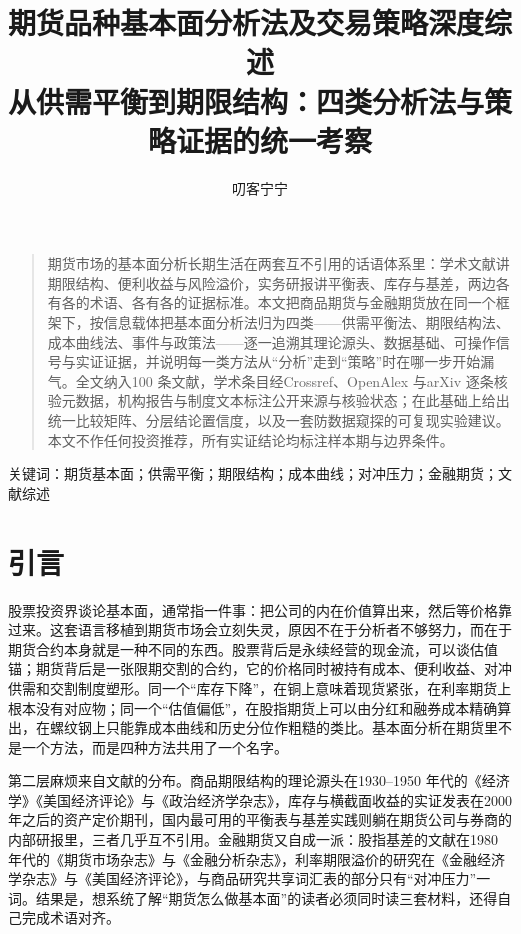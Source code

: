 \documentclass[12pt,a4paper]{ctexart}
\title{\heiti 期货品种基本面分析法及交易策略深度综述\\[4pt]\Large 从供需平衡到期限结构：四类分析法与策略证据的统一考察}
\author{叨客宁宁}
\date{}
\begin{document}
\maketitle
\begin{center}\vspace{-7.2pt}{\small\bfseries 摘要}\vspace{-11.7pt}\end{center}
\begin{quotation}\small
期货市场的基本面分析长期生活在两套互不引用的话语体系里：学术文献讲期限结构、便利收益与风险溢价，实务研报讲平衡表、库存与基差，两边各有各的术语、各有各的证据标准。本文把商品期货与金融期货放在同一个框架下，按信息载体把基本面分析法归为四类——供需平衡法、期限结构法、成本曲线法、事件与政策法——逐一追溯其理论源头、数据基础、可操作信号与实证证据，并说明每一类方法从“分析”走到“策略”时在哪一步开始漏气。全文纳入100 条文献，学术条目经Crossref、OpenAlex 与arXiv 逐条核验元数据，机构报告与制度文本标注公开来源与核验状态；在此基础上给出统一比较矩阵、分层结论置信度，以及一套防数据窥探的可复现实验建议。本文不作任何投资推荐，所有实证结论均标注样本期与边界条件。
\end{quotation}
\vspace{-6.2pt}\noindent 关键词：期货基本面；供需平衡；期限结构；成本曲线；对冲压力；金融期货；文献综述
\vspace{-1.7pt}
\section{引言}

股票投资界谈论基本面，通常指一件事：把公司的内在价值算出来，然后等价格靠过来。这套语言移植到期货市场会立刻失灵，原因不在于分析者不够努力，而在于期货合约本身就是一种不同的东西。股票背后是永续经营的现金流，可以谈估值锚；期货背后是一张限期交割的合约，它的价格同时被持有成本、便利收益、对冲供需和交割制度塑形。同一个“库存下降”，在铜上意味着现货紧张，在利率期货上根本没有对应物；同一个“估值偏低”，在股指期货上可以由分红和融券成本精确算出，在螺纹钢上只能靠成本曲线和历史分位作粗糙的类比\cite{44, 71, 19}。基本面分析在期货里不是一个方法，而是四种方法共用了一个名字。

第二层麻烦来自文献的分布。商品期限结构的理论源头在1930--1950 年代的《经济学》《美国经济评论》与《政治经济学杂志》\cite{01, 05, 02, 06}，库存与横截面收益的实证发表在2000 年之后的资产定价期刊\cite{11, 12, 28}，国内最可用的平衡表与基差实践则躺在期货公司与券商的内部研报里\cite{57, 59, 61}，三者几乎互不引用。金融期货又自成一派：股指基差的文献在1980 年代的《期货市场杂志》与《金融分析杂志》\cite{71, 73}，利率期限溢价的研究在《金融经济学杂志》与《美国经济评论》\cite{66, 67}，与商品研究共享词汇表的部分只有“对冲压力”一词\cite{10, 38}。结果是，想系统了解“期货怎么做基本面”的读者必须同时读三套材料，还得自己完成术语对齐。
\end{document}

